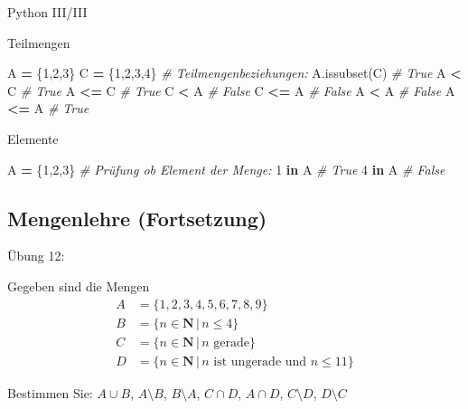 \documentclass[12pt,ngerman,a4paper,ignorenonframetext,]{beamer}
\newenvironment{Shaded}{\begin{snugshade}}{\end{snugshade}}
\newcommand{\CommentTok}[1]{\textcolor[rgb]{0.56,0.35,0.01}{\textit{#1}}}
\newcommand{\DecValTok}[1]{\textcolor[rgb]{0.00,0.00,0.81}{#1}}
\newcommand{\KeywordTok}[1]{\textcolor[rgb]{0.13,0.29,0.53}{\textbf{#1}}}
\newcommand{\NormalTok}[1]{#1}
\newcommand{\OperatorTok}[1]{\textcolor[rgb]{0.81,0.36,0.00}{\textbf{#1}}}
\begin{document}
\begin{frame}[fragile]{Python III/III}
\protect\hypertarget{python-iiiiii}{}

Teilmengen

\begin{Shaded}
\begin{Highlighting}[]
\NormalTok{A }\OperatorTok{=}\NormalTok{ \{}\DecValTok{1}\NormalTok{,}\DecValTok{2}\NormalTok{,}\DecValTok{3}\NormalTok{\}}
\NormalTok{C }\OperatorTok{=}\NormalTok{ \{}\DecValTok{1}\NormalTok{,}\DecValTok{2}\NormalTok{,}\DecValTok{3}\NormalTok{,}\DecValTok{4}\NormalTok{\}}
\CommentTok{# Teilmengenbeziehungen:}
\NormalTok{A.issubset(C)  }\CommentTok{# True}
\NormalTok{A }\OperatorTok{<}\NormalTok{ C  }\CommentTok{# True }
\NormalTok{A }\OperatorTok{<=}\NormalTok{ C  }\CommentTok{# True}
\NormalTok{C }\OperatorTok{<}\NormalTok{ A  }\CommentTok{# False}
\NormalTok{C }\OperatorTok{<=}\NormalTok{ A  }\CommentTok{# False}
\NormalTok{A }\OperatorTok{<}\NormalTok{ A  }\CommentTok{# False}
\NormalTok{A }\OperatorTok{<=}\NormalTok{ A  }\CommentTok{# True}
\end{Highlighting}
\end{Shaded}

Elemente

\begin{Shaded}
\begin{Highlighting}[]
\NormalTok{A }\OperatorTok{=}\NormalTok{ \{}\DecValTok{1}\NormalTok{,}\DecValTok{2}\NormalTok{,}\DecValTok{3}\NormalTok{\}}
\CommentTok{# Prüfung ob Element der Menge:}
\DecValTok{1} \KeywordTok{in}\NormalTok{ A  }\CommentTok{# True}
\DecValTok{4} \KeywordTok{in}\NormalTok{ A  }\CommentTok{# False}
\end{Highlighting}
\end{Shaded}

\end{frame}

\hypertarget{mengenlehre-fortsetzung}{%
\subsection{Mengenlehre (Fortsetzung)}\label{mengenlehre-fortsetzung}}

\begin{frame}{Übung 12:}
\protect\hypertarget{ubung-12}{}

Gegeben sind die Mengen \begin{align*}
    A &= \{ 1,2,3,4,5,6,7,8,9\} \\
    B &= \{ n \in \mathbf{N} \,|\, n \leq 4 \} \\
    C &= \{ n \in \mathbf{N} \,|\, n \text{ gerade} \} \\
    D &= \{ n \in \mathbf{N} \,|\, n \text{ ist ungerade und } n \leq 11 \}
\end{align*}

Bestimmen Sie: \(A \cup B\), \(A \setminus B\), \(B \setminus A\),
\(C \cap D\), \(A \cap D\), \(C \setminus D\), \(D \setminus C\)

\note{}

\end{frame}
\end{document}

